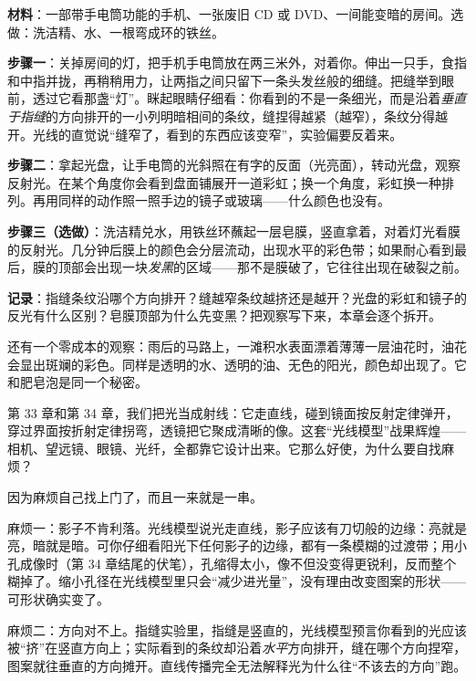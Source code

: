 \begin{experiment}[指缝里的条纹与光盘上的彩虹]
\textbf{材料}：一部带手电筒功能的手机、一张废旧 CD 或 DVD、一间能变暗的房间。选做：洗洁精、水、一根弯成环的铁丝。

\textbf{步骤一}：关掉房间的灯，把手机手电筒放在两三米外，对着你。伸出一只手，食指和中指并拢，再稍稍用力，让两指之间只留下一条头发丝般的细缝。把缝举到眼前，透过它看那盏“灯”。眯起眼睛仔细看：你看到的不是一条细光，而是沿着\emph{垂直于指缝}的方向排开的一小列明暗相间的条纹，缝捏得越紧（越窄），条纹分得越开。光线的直觉说“缝窄了，看到的东西应该变窄”，实验偏要反着来。

\textbf{步骤二}：拿起光盘，让手电筒的光斜照在有字的反面（光亮面），转动光盘，观察反射光。在某个角度你会看到盘面铺展开一道彩虹；换一个角度，彩虹换一种排列。再用同样的动作照一照手边的镜子或玻璃——什么颜色也没有。

\textbf{步骤三（选做）}：洗洁精兑水，用铁丝环蘸起一层皂膜，竖直拿着，对着灯光看膜的反射光。几分钟后膜上的颜色会分层流动，出现水平的彩色带；如果耐心看到最后，膜的顶部会出现一块\emph{发黑}的区域——那不是膜破了，它往往出现在破裂之前。

\textbf{记录}：指缝条纹沿哪个方向排开？缝越窄条纹越挤还是越开？光盘的彩虹和镜子的反光有什么区别？皂膜顶部为什么先变黑？把观察写下来，本章会逐个拆开。
\end{experiment}

还有一个零成本的观察：雨后的马路上，一滩积水表面漂着薄薄一层油花时，油花会显出斑斓的彩色。同样是透明的水、透明的油、无色的阳光，颜色却出现了。它和肥皂泡是同一个秘密。


第 33 章和第 34 章，我们把光当成射线：它走直线，碰到镜面按反射定律弹开，穿过界面按折射定律拐弯，透镜把它聚成清晰的像。这套“光线模型”战果辉煌——相机、望远镜、眼镜、光纤，全都靠它设计出来。它那么好使，为什么要自找麻烦？

因为麻烦自己找上门了，而且一来就是一串。

麻烦一：影子不肯利落。光线模型说光走直线，影子应该有刀切般的边缘：亮就是亮，暗就是暗。可你仔细看阳光下任何影子的边缘，都有一条模糊的过渡带；用小孔成像时（第 34 章结尾的伏笔），孔缩得太小，像不但没变得更锐利，反而整个糊掉了。缩小孔径在光线模型里只会“减少进光量”，没有理由改变图案的形状——可形状确实变了。

麻烦二：方向对不上。指缝实验里，指缝是竖直的，光线模型预言你看到的光应该被“挤”在竖直方向上；实际看到的条纹却沿着\emph{水平}方向排开，缝在哪个方向捏窄，图案就往垂直的方向摊开。直线传播完全无法解释光为什么往“不该去的方向”跑。

